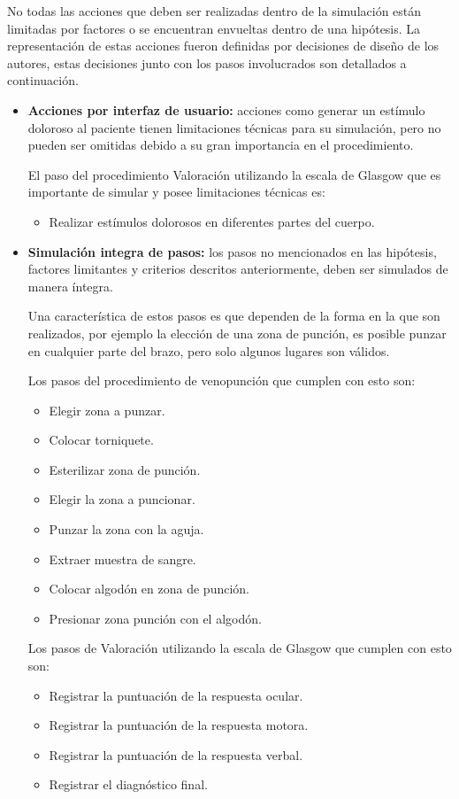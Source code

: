 No todas las acciones que deben ser realizadas dentro de la simulación están
limitadas por factores o se encuentran envueltas dentro de una hipótesis. La
representación de estas acciones fueron definidas por decisiones de diseño de
los autores, estas decisiones junto con los pasos involucrados son detallados a
continuación.

\begin{itemize}

\item \textbf{Acciones por interfaz de usuario:} acciones como generar un
    estímulo doloroso al paciente tienen limitaciones técnicas para su
    simulación, pero no pueden ser omitidas debido a su gran importancia en el
    procedimiento.
 
    El paso del procedimiento Valoración utilizando la escala de Glasgow que es
    importante de simular y posee limitaciones técnicas es:
    \begin{itemize} 
    \item Realizar estímulos dolorosos en diferentes partes del cuerpo. 
    \end{itemize}
    
\item \textbf{Simulación integra de pasos:} 
	los pasos no mencionados en las hipótesis, factores limitantes y criterios descritos 
	anteriormente, deben ser simulados de manera íntegra.
	
	Una característica de estos pasos es que dependen de la forma en la que son 
	realizados, por ejemplo la elección de una zona de punción, es posible punzar en cualquier
	parte del brazo, pero solo algunos lugares son válidos. 

	Los pasos del procedimiento de venopunción que cumplen con esto son:
	\begin{itemize}
    \item Elegir zona a punzar.
    \item Colocar torniquete.
    \item Esterilizar zona de punción.
    \item Elegir la zona a puncionar.
    \item Punzar la zona con la aguja.
    \item Extraer muestra de sangre.
    \item Colocar algodón en zona de punción.
    \item Presionar zona punción con el algodón.
	\end{itemize}

	Los pasos de Valoración utilizando la escala de Glasgow que cumplen con esto son:
	\begin{itemize}
    \item Registrar la puntuación de la respuesta ocular.
    \item Registrar la puntuación de la respuesta motora.
    \item Registrar la puntuación de la  respuesta verbal.
    \item Registrar el diagnóstico final.
	\end{itemize}

\end{itemize}
